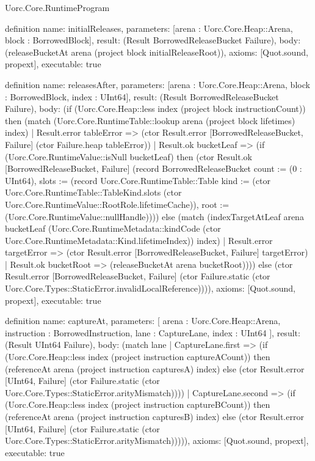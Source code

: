 \begin{lexlean}{Uorc.Core.RuntimeProgram}
\begin{semanticmodule}
definition{
  name: initialReleases,
  parameters: [arena : Uorc.Core.Heap::Arena, block : BorrowedBlock],
  result: (Result BorrowedReleaseBucket Failure),
  body: (releaseBucketAt arena (project block initialReleaseRoot)),
  axioms: [Quot.sound, propext],
  executable: true
}

definition{
  name: releasesAfter,
  parameters: [arena : Uorc.Core.Heap::Arena, block : BorrowedBlock, index : UInt64],
  result: (Result BorrowedReleaseBucket Failure),
  body: (if (Uorc.Core.Heap::less index (project block instructionCount)) then (match (Uorc.Core.RuntimeTable::lookup arena (project block lifetimes) index)
    | Result.error tableError => (ctor Result.error [BorrowedReleaseBucket, Failure] (ctor Failure.heap tableError))
    | Result.ok bucketLeaf => (if (Uorc.Core.RuntimeValue::isNull bucketLeaf) then (ctor Result.ok [BorrowedReleaseBucket, Failure] (record BorrowedReleaseBucket {count := (0 : UInt64), slots := (record Uorc.Core.RuntimeTable::Table {kind := (ctor Uorc.Core.RuntimeTable::TableKind.slots (ctor Uorc.Core.RuntimeValue::RootRole.lifetimeCache)), root := (Uorc.Core.RuntimeValue::nullHandle)})})) else (match (indexTargetAtLeaf arena bucketLeaf (Uorc.Core.RuntimeMetadata::kindCode (ctor Uorc.Core.RuntimeMetadata::Kind.lifetimeIndex)) index)
      | Result.error targetError => (ctor Result.error [BorrowedReleaseBucket, Failure] targetError)
      | Result.ok bucketRoot => (releaseBucketAt arena bucketRoot)))) else (ctor Result.error [BorrowedReleaseBucket, Failure] (ctor Failure.static (ctor Uorc.Core.Types::StaticError.invalidLocalReference)))),
  axioms: [Quot.sound, propext],
  executable: true
}

definition{
  name: captureAt,
  parameters: [
    arena : Uorc.Core.Heap::Arena,
    instruction : BorrowedInstruction,
    lane : CaptureLane,
    index : UInt64
  ],
  result: (Result UInt64 Failure),
  body: (match lane
    | CaptureLane.first => (if (Uorc.Core.Heap::less index (project instruction captureACount)) then (referenceAt arena (project instruction capturesA) index) else (ctor Result.error [UInt64, Failure] (ctor Failure.static (ctor Uorc.Core.Types::StaticError.arityMismatch))))
    | CaptureLane.second => (if (Uorc.Core.Heap::less index (project instruction captureBCount)) then (referenceAt arena (project instruction capturesB) index) else (ctor Result.error [UInt64, Failure] (ctor Failure.static (ctor Uorc.Core.Types::StaticError.arityMismatch))))),
  axioms: [Quot.sound, propext],
  executable: true
}


\end{semanticmodule}
\end{lexlean}

